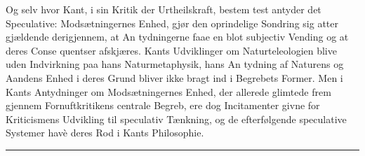 \documentclass[12pt,a4paper]{book}
\newcommand{\divrule}{\begin{center}\rule{2cm}{0.4pt}\end{center}}
\begin{document}
Og selv hvor Kant, i sin Kritik der Urtheilskraft, bestem\-%
test antyder det Speculative: Modsætningernes Enhed, gjør den
oprindelige Sondring sig atter gjældende derigjennem, at An\-%
tydningerne faae en blot subjectiv Vending og at deres Conse\-%
quentser afskjæres. Kants Udviklinger om Naturteleologien
blive uden Indvirkning paa hans Naturmetaphysik, hans An\-%
tydning af Naturens og Aandens Enhed i deres Grund bliver
ikke bragt ind i Begrebets Former. Men i Kants Antydninger
om Modsætningernes Enhed, der allerede glimtede frem gjennem
Fornuftkritikens centrale Begreb, ere dog Incitamenter givne
for Kriticismens Udvikling til speculativ Tænkning, og de
efterfølgende speculative Systemer havè deres Rod i Kants
Philosophie.

\divrule
\end{document}

